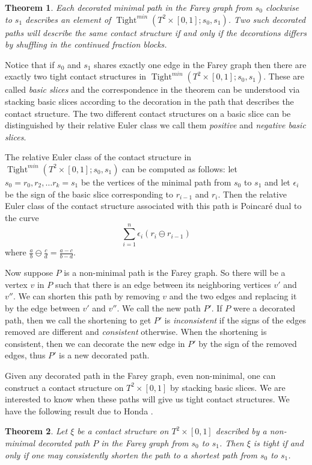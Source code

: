 \documentclass[11pt]{amsart}
\theoremstyle{plain}
\newtheorem{theorem}{Theorem}
\theoremstyle{definition}
\theoremstyle{remark}
\numberwithin{theorem}{section}
\newcommand{\dfn}[1]{{\em #1}}        %
\DeclareMathOperator{\Tight}{Tight}
\begin{document}
\begin{theorem}
Each decorated minimal path in the Farey graph from $s_0$ clockwise to $s_1$ describes an element of $\Tight^{min}(T^2\times[0,1]; s_0, s_1)$. Two such decorated paths will describe the same contact structure if and only if the decorations differs by shuffling in the continued fraction blocks.
\end{theorem}
Notice that if $s_0$ and $s_1$ shares exactly one edge in the Farey graph then there are exactly two tight contact structures in $\Tight^{min}(T^2\times[0,1]; s_0, s_1)$. These are called {\it basic slices} and the correspondence in the theorem can be understood via stacking basic slices according to the decoration in the path that describes the contact structure. The two different contact structures on a basic slice can be distinguished by their relative Euler class we call them {\it positive} and {\it negative basic slices}. 

The relative Euler class of the contact structure in $\Tight^{min}(T^2\times[0,1]; s_0, s_1)$  can be computed as follows: let $s_0=r_0, r_2,\ldots r_k=s_1$ be the vertices of the minimal path from $s_0$ to $s_1$ and let $\epsilon_i$ be the sign of the  basic slice corresponding to $r_{i-1}$ and $r_i$. Then the relative Euler class of the contact structure associated with this path is Poincar\'e dual to the curve 
\[\sum_{i=1}^{n}\epsilon_i(r_i\ominus r_{i-1})\] where $\frac{a}{b}\ominus \frac{c}{d}=\frac{a-c}{b-d}$.


Now suppose $P$ is a non-minimal path is the Farey graph. So there will be a vertex $v$ in $P$ such that there is an edge between its neighboring vertices $v'$ and $v''$. We can shorten this path by removing $v$ and the two edges and replacing it by the edge between $v'$ and $v''$. We call the new path $P'$. If $P$ were a decorated path, then we call the shortening to get $P'$ is \dfn{inconsistent} if the signs of the edges removed are different and \dfn{consistent} otherwise. When the shortening is consistent, then we can decorate the new edge in $P'$ by the sign of the removed edges, thus $P'$ is a new decorated path. 

Given any decorated path in the Farey graph, even non-minimal, one can construct a contact structure on $T^2\times [0,1]$ by stacking basic slices. We are interested to know when these paths will give us tight contact structures.  We have the following result due to Honda \cite{Honda00a}.

\begin{theorem}
Let $\xi$ be a contact structure on $T^2\times [0,1]$ described by a non-minimal decorated path $P$ in the Farey graph from $s_0$ to $s_1$. Then $\xi$ is tight if and only if one may consistently shorten the path to a shortest path from $s_0$ to $s_1$. 	
	\end{theorem}
\end{document}
